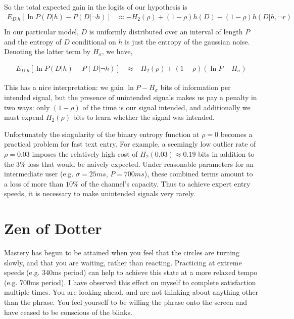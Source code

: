 So the total expected gain in the logits of our hypothesis is
\begin{align*}
E_{D | h}[\ln P(D | h) - P(D | \neg h)] &\approx - H_2(\rho) + (1 - \rho) h(D) - (1 - \rho) h(D | h, \neg r) \\
\end{align*}
In our particular model, $D$ is uniformly distributed over an interval of length $P$ and
the entropy of $D$ conditional on $h$ is just the entropy of the gaussian noise.
Denoting the latter term by $H_{\sigma}$, we have,

\begin{align*}
E_{D | h}[\ln P(D | h) - P(D | \neg h)] &\approx - H_2(\rho) + (1 - \rho) (\ln P - H_{\sigma})
\end{align*}

This has a nice interpretation: we gain $\ln P - H_{\sigma}$ bits of information
per intended signal, but the presence of unintended signals makes us pay a penalty in two ways:
only $(1 - \rho)$ of the time is our signal intended, and additionally we must
expend $H_2(\rho)$ bits to learn whether the signal was intended.

Unfortunately the singularity of the binary entropy function
at $\rho = 0$ becomes a practical problem for fast text entry. For example, a
seemingly low outlier rate of $\rho = 0.03$ imposes the relatively
high cost of $H_2(0.03) \approx 0.19$ bits in addition to the
$3\%$ loss that would be naively expected.
Under reasonable parameters for an intermediate user (e.g. $\sigma = 25ms$, $P = 700ms$),
these combined terms amount to a loss of more than $10\%$ of the channel's capacity.
Thus to achieve expert entry speeds, it is necessary to
make unintended signals very rarely.

\section{Zen of Dotter}
Mastery has begun to be attained when you feel that the circles are turning slowly,
and that you are waiting, rather than reacting.
Practicing at extreme speeds (e.g. 340ms period) can help to achieve this state at a more
relaxed tempo (e.g. 700ms period). I have observed this effect on myself to complete satisfaction
multiple times. 
You are looking ahead, and are not thinking about anything other than the phrase.
You feel yourself to be willing the phrase onto the screen and have ceased to 
be conscious of the blinks.

